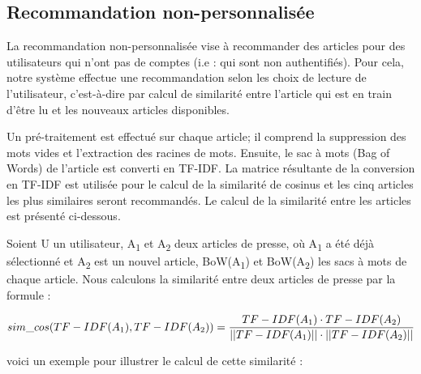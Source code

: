     \subsection{Recommandation non-personnalisée}
    La recommandation non-personnalisée vise à recommander des articles pour des utilisateurs qui n'ont pas de comptes (i.e : qui sont non authentifiés). Pour cela, notre système effectue une recommandation selon les choix de lecture de l'utilisateur, c'est-à-dire par calcul de similarité entre l'article qui est en train d'être lu et les nouveaux articles disponibles. 

    Un pré-traitement est effectué sur chaque article; il comprend la suppression des mots vides et l'extraction des racines de mots. Ensuite, le sac à mots (Bag of Words) de l'article est converti en TF-IDF. La matrice résultante de la conversion en TF-IDF est utilisée pour le calcul de la similarité de cosinus et les cinq articles les plus similaires seront recommandés. Le calcul de la similarité entre les articles est présenté ci-dessous.

    Soient U un utilisateur, A\textsubscript{1} et A\textsubscript{2} deux articles de presse, où A\textsubscript{1} a été déjà sélectionné et A\textsubscript{2} est un nouvel article, BoW(A\textsubscript{1}) et BoW(A\textsubscript{2}) les sacs à mots de chaque article. Nous calculons la similarité entre deux articles de presse par la formule :

    \[sim\_cos(TF-IDF(A\textsubscript{1}), TF-IDF(A\textsubscript{2})) = \frac {TF-IDF(A\textsubscript{1}) \cdot TF-IDF(A\textsubscript{2})}{||TF-IDF(A\textsubscript{1})|| \cdot ||TF-IDF(A\textsubscript{2})||}\]

    voici un exemple pour illustrer le calcul de cette similarité : 

